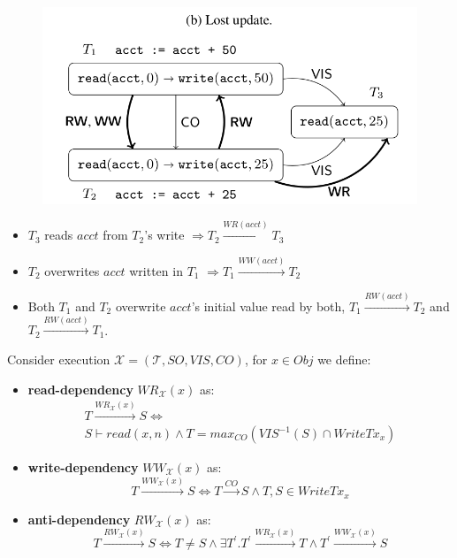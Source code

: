 \documentclass{beamer}
\begin{document}
\begin{frame}
	\begin{figure}
		\includegraphics[scale=0.3]{fig2b}
	\end{figure}
	\begin{example}
		\begin{itemize}
			\item $T_3$ reads $acct$ from $T_2$'s write $\Rightarrow T_2 \xrightarrow{WR(acct)} T_3$
			\item $T_2$ overwrites $acct$ written in $T_1$ $\Rightarrow T_1 \xrightarrow{WW(acct)} T_2$
			\item Both $T_1$ and $T_2$ overwrite $acct$'s initial value read by both, $T_1 \xrightarrow{RW(acct)} T_2$ and $T_2 \xrightarrow{RW(acct)} T_1$.
		\end{itemize}
	\end{example}
\end{frame}


\begin{frame}
	\begin{definition}
		Consider execution $\mathcal{X} = (\mathcal{T}, SO, VIS, CO)$, for $x \in Obj$ we define:
		\begin{itemize}
			\item \textbf{read-dependency} $WR_\mathcal{X}(x)$ as:
				\begin{multline*}
					T \xrightarrow{WR_\mathcal{X}(x)} S \Leftrightarrow \\
					S \vdash read(x,n) \wedge T = max_{CO}\left( VIS^{-1}(S) \cap WriteTx_x \right)
				\end{multline*}
			\item \textbf{write-dependency} $WW_\mathcal{X}(x)$ as:
				$$
				T \xrightarrow{WW_\mathcal{X}(x)} S \Leftrightarrow T \xrightarrow{CO}S \wedge T,S \in WriteTx_x
				$$
			\item \textbf{anti-dependency} $RW_\mathcal{X}(x)$ as:
				$$
				T \xrightarrow{RW_\mathcal{X}(x)} S \Leftrightarrow
				T \ne S \wedge \exists T^\prime . T^\prime \xrightarrow{WR_\mathcal{X}(x)}T \wedge T^\prime \xrightarrow{WW_\mathcal{X}(x)}S
				$$
		\end{itemize}
	\end{definition}\end{frame}
\end{document}
